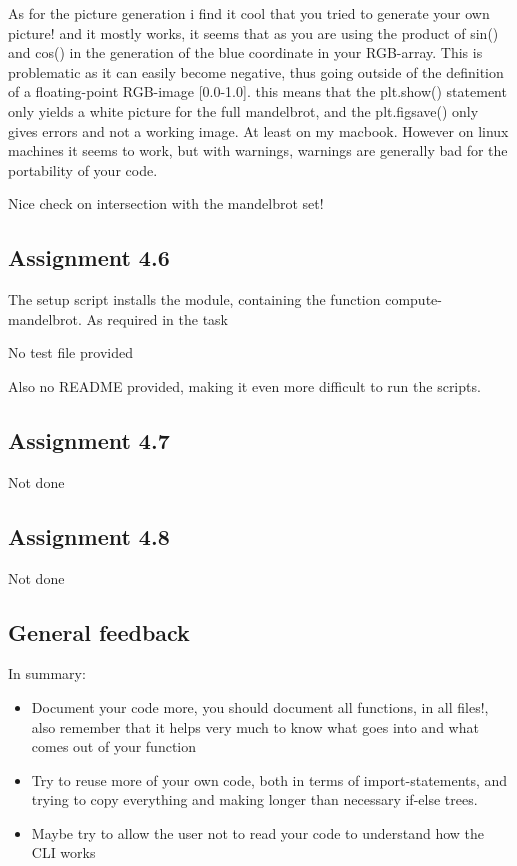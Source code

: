\documentclass[a4paper]{article}
\begin{document}
\medskip

As for the picture generation i find it cool that you tried to generate your own picture! and it mostly works, it seems that as you are using the product of sin() and cos() in the generation of the blue coordinate in your RGB-array. This is problematic as it can easily become negative, thus going outside of the definition of a floating-point RGB-image [0.0-1.0]. this means that the plt.show() statement only yields a white picture for the full mandelbrot, and the plt.figsave() only gives errors and not a working image. At least on my macbook. However on linux machines it seems to work, but with warnings, warnings are generally bad for the portability of your code.

\medskip

Nice check on intersection with the mandelbrot set!

\subsection*{Assignment 4.6}


The setup script installs the module, containing the function compute-mandelbrot. As required in the task

No test file provided

Also no README provided, making it even more difficult to run the scripts.

\subsection*{Assignment 4.7}


\medskip

Not done

\subsection*{Assignment 4.8}

\medskip

Not done


\subsection*{General feedback}


In summary:

\begin{itemize}
  \item Document your code more, you should document all functions, in all files!, also remember that it helps very much to know what goes into and what comes out of your function
  \item Try to reuse more of your own code, both in terms of import-statements, and trying to copy everything and making longer than necessary if-else trees.
  \item Maybe try to allow the user not to read your code to understand how the CLI works
\end{itemize}



\end{document}
